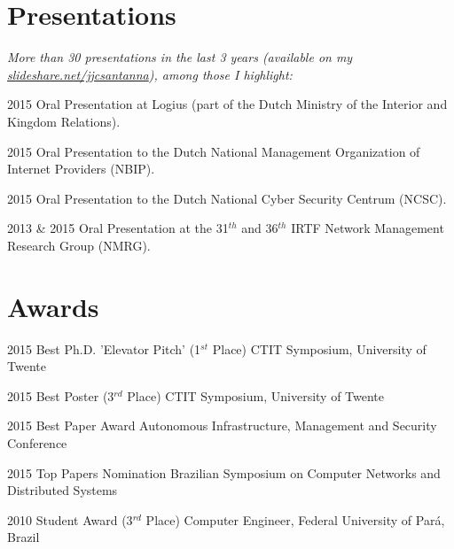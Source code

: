 \documentclass[]{friggeri-cv} %
\begin{document}
\section{Presentations}
\emph{More than 30 presentations in the last 3 years (available on my  \href{http://www.slideshare.net/jjcsantanna}{slideshare.net/jjcsantanna}), among those I highlight:}

\begin{entrylist}

\vspace{-0.3cm}
\entry
{2015}
{Oral Presentation}
{at Logius (part of the Dutch Ministry of the Interior and Kingdom Relations).}

\vspace{-0.3cm}
\entry
{2015}
{Oral Presentation}
{to the Dutch National Management Organization of Internet Providers (NBIP).}

\vspace{-0.3cm}
\entry
{2015}
{Oral Presentation}
{to the Dutch National Cyber Security Centrum (NCSC).}

\vspace{-0.3cm}
\entry
{2013 \& 2015}
{Oral Presentation}
{at the 31$^{th}$ and 36$^{th}$ IRTF Network Management Research Group (NMRG).}

\end{entrylist}

\section{Awards}

\begin{entrylist}
\vspace{-0.3cm}
\entry
{2015}
{Best Ph.D. 'Elevator Pitch' (1$^{st}$ Place)}
{CTIT Symposium, University of Twente}

\vspace{-0.3cm}
\entry
{2015}
{Best Poster (3$^{rd}$ Place)}
{CTIT Symposium, University of Twente}

\vspace{-0.3cm}
\entry
{2015}
{Best Paper Award}
{Autonomous Infrastructure, Management and Security Conference}

\vspace{-0.3cm}
\entry
{2015}
{Top Papers Nomination}
{Brazilian Symposium on Computer Networks and Distributed Systems}

\vspace{-0.3cm}
\entry
{2010}
{Student Award (3$^{rd}$ Place)}
{Computer Engineer, Federal University of Pará, Brazil}

\end{entrylist}
\end{document}
